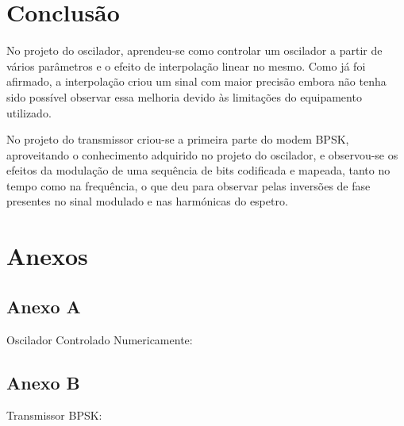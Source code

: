 \documentclass[11pt]{article}
\numberwithin{equation}{section}
\begin{document}
\section{Conclusão}


No projeto do oscilador, aprendeu-se como controlar um oscilador a partir de vários parâmetros e o efeito de interpolação linear no mesmo. Como já foi afirmado, a interpolação criou um sinal com maior precisão embora não tenha sido possível observar essa melhoria devido às limitações do equipamento utilizado.

No projeto do transmissor criou-se a primeira parte do modem BPSK, aproveitando o conhecimento adquirido no projeto do oscilador, e observou-se os efeitos da modulação de uma sequência de bits codificada e mapeada, tanto no tempo como na frequência, o que deu para observar pelas inversões de fase presentes no sinal modulado e nas harmónicas do espetro.

\section{Anexos}
\subsection{Anexo A}
Oscilador Controlado Numericamente:


\subsection{Anexo B}
Transmissor BPSK:

\end{document}
